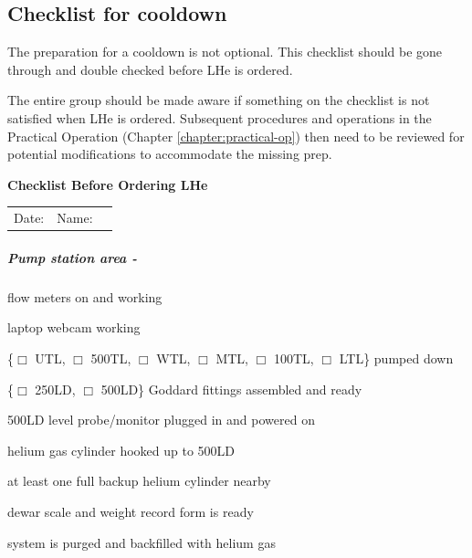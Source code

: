 \begin{appendices}
\noappendicestocpagenum
\addappheadtotoc
\chapter{Checklist for cooldown}
\label{appendix:checklist-for-cooldown}

The preparation for a cooldown is not optional.  This checklist should be gone through and double checked before LHe is ordered.


The entire group should be made aware if something on the checklist is not satisfied when LHe is ordered.  Subsequent procedures and operations in the Practical Operation (Chapter \ref{chapter:practical-op}) then need to be reviewed for potential modifications to accommodate the missing prep.


\pagebreak
{\huge \textbf{Checklist Before Ordering LHe}}

\begin{tabular}{ l r c }
  Date: \underline{\hspace{4cm}} & Name: \underline{\hspace{4cm}} \\
\end{tabular}

\paragraph{Pump station area - \hef}

\begin{checklist}
 \item flow meters on and working
 \item laptop webcam working
 \item \{$\Box$ UTL, $\Box$ 500TL, $\Box$ WTL, $\Box$ MTL, $\Box$ 100TL, $\Box$ LTL\} pumped down
 \item \{$\Box$ 250LD, $\Box$ 500LD\} Goddard fittings assembled and ready
 \item 500LD level probe/monitor plugged in and powered on
 \item helium gas cylinder hooked up to 500LD
 \item at least one full backup helium cylinder nearby
 \item dewar scale and weight record form is ready
 \item system is purged and backfilled with helium gas
\end{checklist}


\end{appendices}
